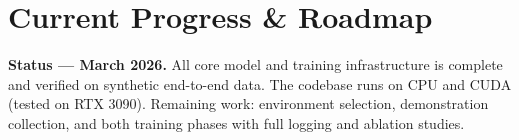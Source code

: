 \documentclass[11pt, a4paper]{article}
\begin{document}
\newpage
\section{Current Progress \& Roadmap}

\begin{notebox}
\small
\textbf{Status --- March 2026.}\enspace
All core model and training infrastructure is complete and verified on
synthetic end-to-end data.  The codebase runs on CPU and CUDA (tested on
RTX 3090).  Remaining work: environment selection, demonstration collection,
and both training phases with full logging and ablation studies.
\end{notebox}

\vspace{4pt}
\end{document}
